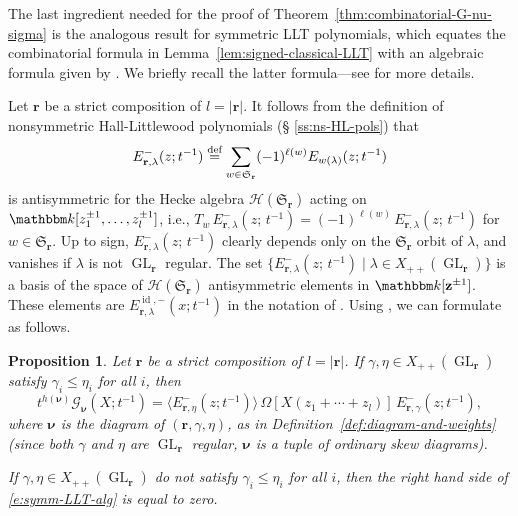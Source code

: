 \documentclass[12pt]{amsart}
\newtheorem{prop}[thm]{Proposition}
\theoremstyle{definition}
\theoremstyle{remark}
\newcommand{\kk}{{\mathbbm k}}
\newcommand{\rr}{{\mathbf r}}
\newcommand{\zz}{{\mathbf z}}
\newcommand{\nubold}{{\boldsymbol \nu }}
\newcommand{\Sfrak}{{\mathfrak S}}
\newcommand{\Gcal}{{\mathcal G}}
\newcommand{\Hcal}{{\mathcal H}}
\DeclareMathOperator{\GL}{GL}
\newcommand{\defeq}{\mathrel{\overset{\text{{\rm def}}}{=}}}
\begin{document}
The last ingredient needed for the proof of
Theorem~\ref{thm:combinatorial-G-nu-sigma} is the analogous result for
symmetric LLT polynomials, which equates the combinatorial formula in
Lemma~\ref{lem:signed-classical-LLT} with an algebraic formula given
by \cite[Theorem 5.5.4]{BHMPS25a}.  We briefly recall the latter
formula---see \cite[\S 5]{BHMPS25a} for more details.

Let $\rr $ be a strict composition of $l=|\rr |$.  It follows from the
definition of nonsymmetric Hall-Littlewood polynomials (\S
\ref{ss:ns-HL-pols}) that
\begin{equation}\label{e:E-anti}
E^{-}_{\rr ,\lambda }(z;t^{-1}) \defeq \sum _{w\in \Sfrak _{\rr }}
(-1)^{\ell (w)} E_{w(\lambda )}(z;t^{-1})
\end{equation}
is antisymmetric for the Hecke algebra $\Hcal (\Sfrak _{\rr })$ acting
on $\kk [z_{1}^{\pm 1},\ldots,z_{l}^{\pm 1}]$, i.e., $T_{w}\,
E^{-}_{\rr ,\lambda }(z;\, t^{-1}) = (-1)^{\ell (w)}\, E^{-}_{\rr
,\lambda }(z;\, t^{-1})$ for $w \in \Sfrak _{\rr }$.  Up to sign,
$E^{-}_{\rr ,\lambda }(z;\, t^{-1})$ clearly depends only on the
$\Sfrak _{\rr }$ orbit of $\lambda $, and vanishes if $\lambda $ is
not $\GL _{\rr }$ regular.  The set $\{ E^{-}_{\rr ,\lambda }(z;\,
t^{-1}) \mid \lambda \in X_{++}(\GL _{\rr }) \}$ is a basis of the
space of $\Hcal (\Sfrak _{\rr })$ antisymmetric elements in $\kk [\zz
^{\pm 1}]$.  These elements are $E^{\operatorname{id},-}_{\rr ,\lambda
}(x;t^{-1})$ in the notation of \cite[eq.~(116)]{BHMPS25a}.  Using
\cite[Remark 5.4.2(i)]{BHMPS25a}, we can formulate \cite[Theorem
5.5.4]{BHMPS25a} as follows.

\begin{prop}\label{prop:symm-LLT-alg}
Let $\rr $ be a strict composition of $l = |\rr |$.  If $\gamma ,\eta
\in X_{++}(\GL _{\rr})$ satisfy $\gamma _{i}\leq \eta _{i}$ for all
$i$, then
\begin{equation}\label{e:symm-LLT-alg}
t^{h(\nubold )} \Gcal _{\nubold }(X; t^{-1}) = \langle E^{-}_{\rr,
\eta }(z; t^{-1}) \rangle\, \Omega [X (z_{1}+\cdots +z_{l})]\,
E^{-}_{\rr, \gamma }(z; t^{-1}),
\end{equation}
where $\nubold $ is the diagram of $(\rr ,\gamma ,\eta )$, as in
Definition~\ref{def:diagram-and-weights} (since both $\gamma $ and
$\eta $ are $\GL _{\rr}$ regular, $\nubold $ is a tuple of ordinary
skew diagrams).

If $\gamma ,\eta \in X_{++}(\GL _{\rr })$ do not satisfy $\gamma
_{i}\leq \eta _{i}$ for all $i$, then the right hand side of
\eqref{e:symm-LLT-alg} is equal to zero.
\end{prop}
\end{document}
